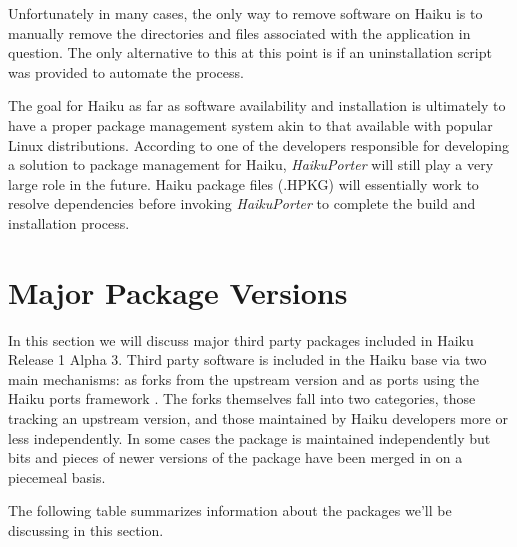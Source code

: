 \documentclass{article}
\begin{document}
Unfortunately in many cases, the only way to remove software on Haiku
is to manually remove the directories and files associated with the
application in question. The only alternative to this at this point is
if an uninstallation script was provided to automate the
process.\cite{AppInstallUninstall}

The goal for Haiku as far as software availability and installation is
ultimately to have a proper package management system akin to that
available with popular Linux distributions.\cite{HaikuFuturePkgMan}
According to one of the developers responsible for developing a
solution to package management for Haiku, \textit{HaikuPorter} will
still play a very large role in the future. Haiku package files
(.HPKG) will essentially work to resolve dependencies before
invoking \textit{HaikuPorter} to complete the build and installation
process.\cite{TappeOnPackages}

\section{Major Package Versions}

In this section we will discuss major third party packages included in
Haiku Release 1 Alpha 3.  Third party software is included in the
Haiku base via two main mechanisms: as forks from the upstream version
and as ports using the Haiku ports framework \cite{HaikuR1A3Src}.  The
forks themselves fall into two categories, those tracking an upstream
version, and those maintained by Haiku developers more or less
independently.  In some cases the package is maintained independently
but bits and pieces of newer versions of the package have been merged
in on a piecemeal basis.

The following table summarizes information about the packages we'll be
discussing in this section.
\end{document}
